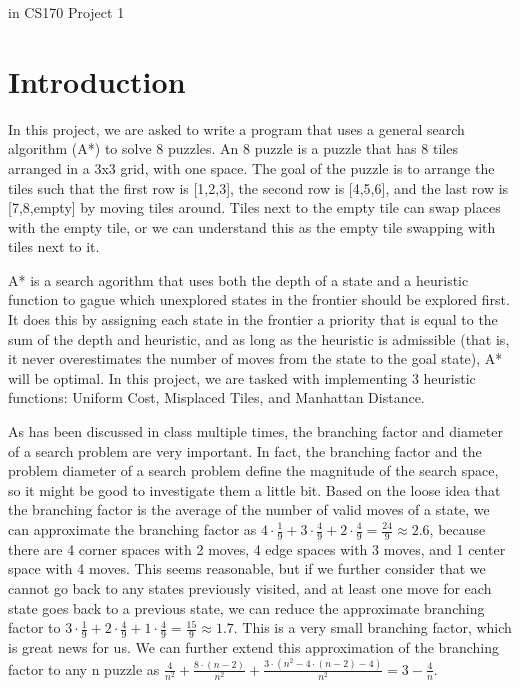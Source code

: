 \documentclass{article}
\date{}
\begin{document}
{\LARGE{ in CS170 Project 1}}
\vskip 0.5in
{}
{}
{}
{}
\vskip 0.5in
\tableofcontents
\listoffigures
\pagebreak
\section{Introduction}
In this project, we are asked to write a program that uses a general search algorithm (A*) to solve 8 puzzles. An 8 puzzle is a puzzle that has 8 tiles arranged in a 3x3 grid, with one space. The goal of the puzzle is to arrange the tiles such that the first row is [1,2,3], the second row is [4,5,6], and the last row is [7,8,empty] by moving tiles around. Tiles next to the empty tile can swap places with the empty tile, or we can understand this as the empty tile swapping with tiles next to it.
\par A* is a search agorithm that uses both the depth of a state and a heuristic function to gague which unexplored states in the frontier should be explored first. It does this by assigning each state in the frontier a priority that is equal to the sum of the depth and heuristic, and as long as the heuristic is admissible (that is, it never overestimates the number of moves from the state to the goal state), A* will be optimal. In this project, we are tasked with implementing 3 heuristic functions: Uniform Cost, Misplaced Tiles, and Manhattan Distance.
\par As has been discussed in class multiple times, the branching factor and diameter of a search problem are very important. In fact, the branching factor and the problem diameter of a search problem define the magnitude of the search space, so it might be good to investigate them a little bit. Based on the loose idea that the branching factor is the average of the number of valid moves of a state, we can approximate the branching factor as $4\cdot\frac{1}{9}+3\cdot\frac{4}{9}+2\cdot\frac{4}{9} = \frac{24}{9} \approx 2.6$, because there are 4 corner spaces with 2 moves, 4 edge spaces with 3 moves, and 1 center space with 4 moves. This seems reasonable, but if we further consider that we cannot go back to any states previously visited, and at least one move for each state goes back to a previous state, we can reduce the approximate branching factor to $3\cdot\frac{1}{9}+2\cdot\frac{4}{9}+1\cdot\frac{4}{9} = \frac{15}{9} \approx 1.7$. This is a very small branching factor, which is great news for us. We can further extend this approximation of the branching factor to any n puzzle as $\frac{4}{n^2}+\frac{8\cdot(n-2)}{n^2}+\frac{3\cdot(n^2-4\cdot(n-2)-4)}{n^2} = 3-\frac{4}{n}$.
\end{document}
